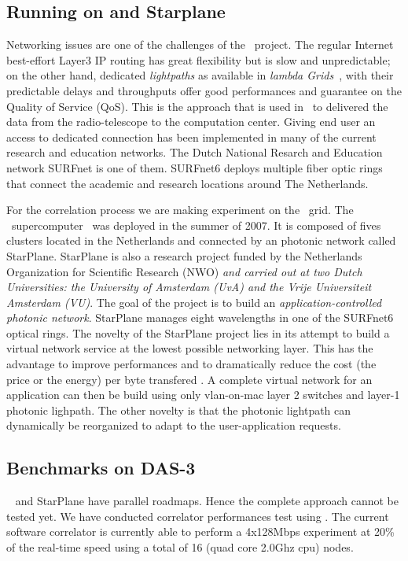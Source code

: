 \subsection{Running \scarie on  and Starplane}
Networking issues are one of the challenges of the \scarie\ project.
The regular Internet best-effort Layer3
IP routing has great flexibility but is slow and unpredictable; on the
other hand, dedicated \textit{lightpaths} as available in
\textit{lambda Grids}~\cite{eslea-2007}, with their predictable delays
and throughputs offer good performances and guarantee on the Quality
of Service (QoS). This is the approach that is used in \scarie\ to
delivered the data from the radio-telescope to the computation center.
Giving end user an access to dedicated connection has been implemented
in many of the current research and education networks. The Dutch
National Resarch and Education network SURFnet is one of them.
SURFnet6 deploys multiple fiber optic rings that connect the academic
and research locations around The Netherlands.

For the correlation process we are making experiment on the \
grid. The \ supercomputer~\cite{das3} was
deployed in the summer of 2007. It is composed of fives clusters
located in the Netherlands and connected by an photonic network called
StarPlane. StarPlane is also a research project funded by the
Netherlands Organization for Scientific Research (NWO) \emph{and
  carried out at two Dutch Universities: the University of Amsterdam
  (UvA) and the Vrije Universiteit Amsterdam (VU)}\marginpar{NGHK:
  needed?}. The goal of the project is to build an
\textit{application-controlled photonic network}. StarPlane manages
eight wavelengths in one of the SURFnet6 optical rings. The novelty of
the StarPlane project lies in its attempt to build a virtual network
service at the lowest possible networking layer. This has the
advantage to improve performances and to dramatically reduce the cost
(the price or the energy) per byte transfered \cite{}\marginpar{TODO}.
A complete virtual network for an application can then be build using
only vlan-on-mac layer 2 switches and layer-1 photonic lighpath. The
other novelty is that the photonic lightpath can dynamically be
reorganized to adapt to the user-application requests.


\subsection{Benchmarks on DAS-3}
\scarie~ and StarPlane have parallel roadmaps. Hence the complete
approach cannot be tested yet. We have conducted correlator
performances test using . The current software correlator is
currently able to perform a 4x128Mbps experiment at 20\% of the
real-time speed using a total of 16 (quad core 2.0Ghz cpu) nodes.

